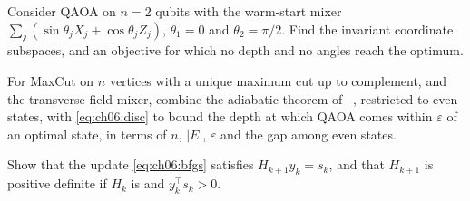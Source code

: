 \documentclass[handoutsbeamer.tex]{subfiles}
\begin{document}
\begin{frame}
\onp{\footnotesize}
\begin{exe}
Consider QAOA on $n = 2$ qubits with the warm-start mixer $\sum_j(\sin\theta_jX_j + \cos\theta_jZ_j)$, $\theta_1 = 0$ and $\theta_2 = \pi/2$. Find the invariant coordinate subspaces, and an objective for which no depth and no angles reach the optimum.
\end{exe}
\begin{exe}
For MaxCut on $n$ vertices with a unique maximum cut up to complement, and the transverse-field mixer, combine the adiabatic theorem of \Chap~, restricted to even states, with \eqref{eq:ch06:disc} to bound the depth at which QAOA comes within $\varepsilon$ of an optimal state, in terms of $n$, $|E|$, $\varepsilon$ and the gap among even states.
\end{exe}
\begin{exe}[BFGS]
Show that the update \eqref{eq:ch06:bfgs} satisfies $H_{k+1}y_k = s_k$, and that $H_{k+1}$ is positive definite if $H_k$ is and $y_k^\top s_k>0$.
\end{exe}
\end{frame}

\begin{frame}[allowframebreaks]
\biblio
\end{frame}
\end{document}
